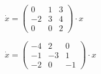 \begin{multicols}{3}
\begin{enumtasks}
			\label{linsys_hmg:transformation_complex}
			\item \( \dot{x} = \begin{pmatrix} 0 & 1 & 3 \\ -2 & 3 & 4 \\ 0 & 0 & 2 \end{pmatrix} \cdot x \) %
			\item \( \dot{x} = \begin{pmatrix} -4 & 2 & 0 \\ -1 & -3 & 1 \\ -2 & 0 & -1 \end{pmatrix} \cdot x \) %

\end{enumtasks}
\end{multicols}
